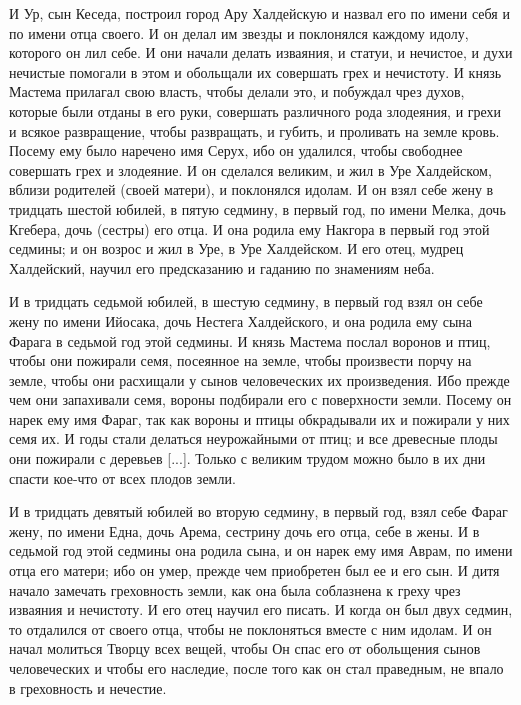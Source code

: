 И Ур, сын Кеседа, построил город Ару Халдейскую
и назвал его по имени себя и по имени отца своего.
И он делал им звезды и поклонялся каждому идолу,
которого он лил себе. И они начали делать
изваяния, и статуи, и нечистое, и духи нечистые
помогали в этом и обольщали их совершать грех и
нечистоту. И князь Мастема прилагал свою власть,
чтобы делали это, и побуждал чрез духов, которые
были отданы в его руки, совершать различного рода
злодеяния, и грехи и всякое развращение, чтобы
развращать, и губить, и проливать на земле кровь.
Посему ему было наречено имя Серух, ибо он
удалился, чтобы свободнее совершать грех и
злодеяние. И он сделался великим, и жил в Уре
Халдейском, вблизи родителей (своей матери), и
поклонялся идолам. И он взял себе жену в тридцать
шестой юбилей, в пятую седмину, в первый год, по
имени Мелка, дочь Кгебера, дочь (сестры) его отца.
И она родила ему Накгора в первый год этой
седмины; и он возрос и жил в Уре, в Уре Халдейском.
И его отец, мудрец Халдейский, научил его
предсказанию и гаданию по знамениям неба.

И в тридцать седьмой юбилей, в шестую седмину, в
первый год взял он себе жену по имени Ийосака,
дочь Нестега Халдейского, и она родила ему сына
Фарага в седьмой год этой седмины. И князь
Мастема послал воронов и птиц, чтобы они пожирали
семя, посеянное на земле, чтобы произвести порчу
на земле, чтобы они расхищали у сынов
человеческих их произведения. Ибо прежде чем они
запахивали семя, вороны подбирали его с
поверхности земли. Посему он нарек ему имя Фараг,
так как вороны и птицы обкрадывали их и пожирали
у них семя их. И годы стали делаться неурожайными
от птиц; и все древесные плоды они пожирали с
деревьев [...]. Только с великим трудом можно было в
их дни спасти кое-что от всех плодов земли.

И в тридцать девятый юбилей во вторую седмину, в
первый год, взял себе Фараг жену, по имени Една,
дочь Арема, сестрину дочь его отца, себе в жены. И
в седьмой год этой седмины она родила сына, и он
нарек ему имя Аврам, по имени отца его матери; ибо
он умер, прежде чем приобретен был ее и его сын. И
дитя начало замечать греховность земли, как она
была соблазнена к греху чрез изваяния и
нечистоту. И его отец научил его писать. И когда
он был двух седмин, то отдалился от своего отца,
чтобы не поклоняться вместе с ним идолам. И он
начал молиться Творцу всех вещей, чтобы Он спас
его от обольщения сынов человеческих и чтобы его
наследие, после того как он стал праведным, не
впало в греховность и нечестие.

